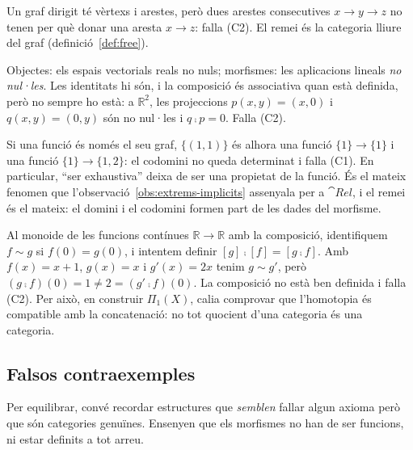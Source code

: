 \begin{exemple}
Un graf dirigit té vèrtexs i arestes, però dues arestes consecutives $x\to y\to z$ no tenen per què donar una aresta $x\to z$: falla (C2). El remei és la categoria lliure del graf (definició~\ref{def:free}).
\end{exemple}

\begin{exemple}
Objectes: els espais vectorials reals no nuls; morfismes: les aplicacions lineals \emph{no nul·les}. Les identitats hi són, i la composició és associativa quan està definida, però no sempre ho està: a $\mathbb R^2$, les projeccions $p(x,y)=(x,0)$ i $q(x,y)=(0,y)$ són no nul·les i $q\comp p=0$. Falla (C2).
\end{exemple}

\begin{exemple}
Si una funció és només el seu graf, $\{(1,1)\}$ és alhora una funció $\{1\}\to\{1\}$ i una funció $\{1\}\to\{1,2\}$: el codomini no queda determinat i falla (C1). En particular, \enquote{ser exhaustiva} deixa de ser una propietat de la funció. És el mateix fenomen que l'observació~\ref{obs:extrems-implicits} assenyala per a $\cat{Rel}$, i el remei és el mateix: el domini i el codomini formen part de les dades del morfisme.
\end{exemple}

\begin{exemple}
Al monoide de les funcions contínues $\mathbb R\to\mathbb R$ amb la composició, identifiquem $f\sim g$ si $f(0)=g(0)$, i intentem definir $[g]\comp[f]=[g\comp f]$. Amb $f(x)=x+1$, $g(x)=x$ i $g'(x)=2x$ tenim $g\sim g'$, però $(g\comp f)(0)=1\neq2=(g'\comp f)(0)$. La composició no està ben definida i falla (C2). Per això, en construir $\Pi_1(X)$, calia comprovar que l'homotopia és compatible amb la concatenació: no tot quocient d'una categoria és una categoria.
\end{exemple}

\subsection{Falsos contraexemples}

Per equilibrar, convé recordar estructures que \emph{semblen} fallar algun axioma però que són categories genuïnes. Ensenyen que els morfismes no han de ser funcions, ni estar definits a tot arreu.

